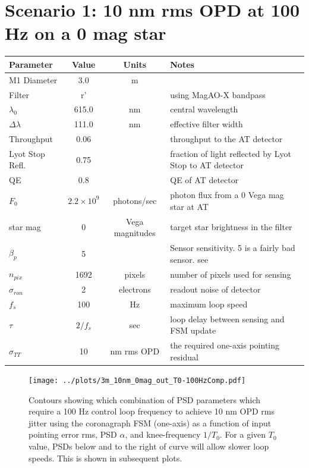 \documentclass[10pt,preprint]{aastex631}
\begin{document}
\clearpage

\section{Scenario 1: 10 nm rms OPD at 100 Hz on a 0 mag star}

\begin{table}[h!]
\begin{tabular}{lccl}
\hline
\hline
Parameter & Value & Units & Notes \\
\hline
M1 Diameter & 3.0 & m &\\
Filter      & r'  &   & using MagAO-X bandpass \\
$\lambda_0$  & 615.0 & nm & central wavelength \\
$\Delta \lambda$ &  111.0 & nm & effective filter width \\
Throughput  & 0.06 && throughput to the AT detector \\
Lyot Stop Refl. & 0.75 & & fraction of light reflected by Lyot Stop to AT detector \\
QE & 0.8 && QE of AT detector \\
$F_0$ & $2.2\times10^{9}$ & photons/sec & photon flux from a 0 Vega mag star at AT \\
star mag & 0 & Vega magnitudes & target star brightness in the filter \\
$\beta_p$ & 5 & & Sensor sensitivity. 5 is a fairly bad sensor. see \citep{2005ApJ...629..592G} \\
$n_{pix}$ & 1692 & pixels & number of pixels used for sensing \\
$\sigma_{ron}$ & 2 & electrons & readout noise of detector\\
$f_s$ & 100 & Hz & maximum loop speed \\
$\tau$ & $2/f_s$ & sec & loop delay between sensing and FSM update \\
$\sigma_{TT}$ & 10 & nm rms OPD & the required one-axis pointing residual\\
\hline
\end{tabular}
\end{table}

\begin{figure}[h!]
\centering
\texttt{[image: ../plots/3m\_10nm\_0mag\_out\_T0-100HzComp.pdf]}
\caption{Contours showing which combination of PSD parameters which require a 100 Hz control loop frequency to achieve 10 nm OPD rms jitter using the coronagraph FSM (one-axis) as a function of input pointing error rms, PSD $\alpha$, and knee-frequency $1/T_0$. For a given $T_0$ value, PSDs below and to the right of curve will allow slower loop speeds.  This is shown in subsequent plots.  \label{fig:s1_T0-100HzComp}}
\end{figure}
\end{document}
